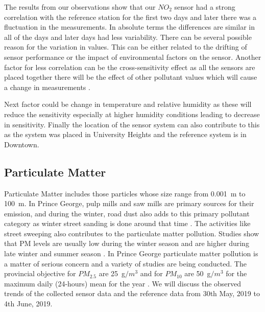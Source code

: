     The results from our observations show that our ${NO_2}$ sensor had a strong correlation with the reference station for the first two days and later there was a fluctuation in the measurements. In absolute terms the differences are similar in all of the days and later days had less variability. There can be several possible reason for the variation in values. This can be either related to the drifting of sensor performance or the impact of environmental factors on the sensor. Another factor for less correlation can be the cross-sensitivity effect as all the sensors are placed together there will be the effect of other pollutant values which will cause a change in measurements \cite{clements2017low}.

 Next factor could be change in temperature and relative humidity as these will reduce the sensitivity especially at higher humidity conditions leading to decrease in sensitivity\cite{clements2017low}. Finally the location of the sensor system can also contribute to this as the system was placed in University Heights and the reference system is in Downtown.
    



 \subsection{Particulate Matter}


Particulate Matter includes those particles whose size range from 0.001~{\textmu}m to 100~{\textmu}m. In Prince George, pulp mills and saw mills are primary sources for their emission, and during the winter,  road dust also adds to this primary pollutant category as winter street sanding is done around that time \cite{Champagne1996}. The activities like street sweeping also contributes to the particulate matter pollution. Studies show that PM levels are usually low during the winter season and are higher during late winter and summer season \cite{EnvironmentalQualitySectionMoE2012}. In Prince George particulate matter pollution is a matter of serious concern and a variety of studies are being conducted. The provincial objective for $PM_{2.5}$ are 25~{\textmu}g$/m^3$ and for $PM_{10}$ are 50~{\textmu}g$/m^3$ for the maximum daily (24-hours) mean for the year \cite{Environment2016}. We will discuss the observed trends of the collected sensor data and the reference data from 30th May, 2019 to 4th June, 2019.

